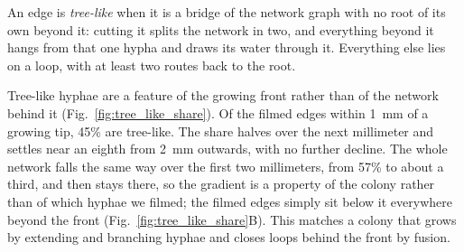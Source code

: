 
An edge is \emph{tree-like} when it is a bridge of the network graph with no root of its own beyond it: cutting it splits the network in two, and everything beyond it hangs from that one hypha and draws its water through it.
Everything else lies on a loop, with at least two routes back to the root.

Tree-like hyphae are a feature of the growing front rather than of the network behind it (Fig.~\ref{fig:tree_like_share}).
Of the filmed edges within 1~mm of a growing tip, 45\% are tree-like.
The share halves over the next millimeter and settles near an eighth from 2~mm outwards, with no further decline.
The whole network falls the same way over the first two millimeters, from 57\% to about a third, and then stays there, so the gradient is a property of the colony rather than of which hyphae we filmed; the filmed edges simply sit below it everywhere beyond the front (Fig.~\ref{fig:tree_like_share}B).
This matches a colony that grows by extending and branching hyphae and closes loops behind the front by fusion.

